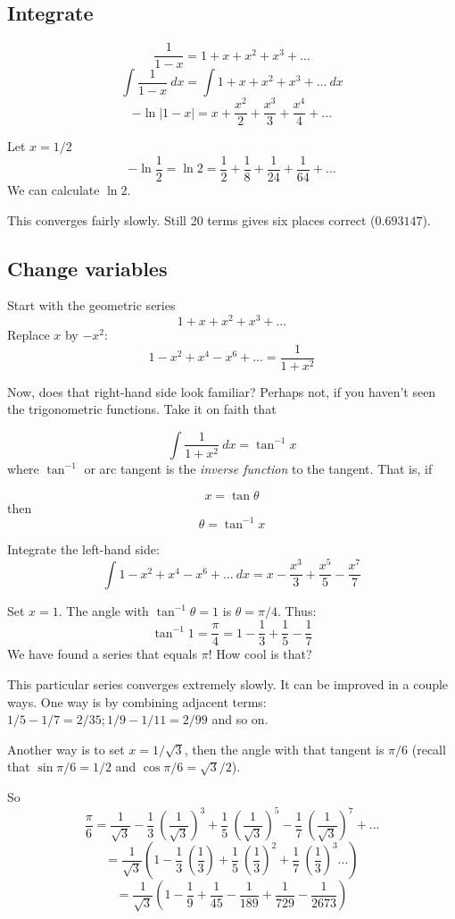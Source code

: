\documentclass[11pt, oneside]{article}
\begin{document}
\subsection*{Integrate}
\[    \frac{1}{1-x} = 1 + x + x^2 + x^3 + \dots \]
\[    \int \frac{1}{1-x} \ dx = \int 1 + x + x^2 + x^3 + \dots \ dx \]
\[     -\ln |1-x| = x + \frac{x^2}{2} + \frac{x^3}{3} + \frac{x^4}{4} + \dots \]

Let $x = 1/2$
\[ - \ln \frac{1}{2} = \ln 2 = \frac{1}{2} + \frac{1}{8} + \frac{1}{24} + \frac{1}{64} + \dots \]
We can calculate $\ln 2$.

This converges fairly slowly.  Still 20 terms gives six places correct ($0.693147$).

\subsection*{Change variables}
Start with the geometric series
\[    1 + x + x^2 + x^3 + \dots \]
Replace $x$ by $-x^2$:
\[    1 - x^2 + x^4 - x^6 + \dots = \frac{1}{1+x^2} \]

Now, does that right-hand side look familiar?  Perhaps not, if you haven't seen the trigonometric functions.  Take it on faith that

\[    \int \frac{1}{1+x^2} \ dx = \tan^{-1} x \]
where $ \tan^{-1}$ or arc tangent is the \emph{inverse function} to the tangent.  That is, if

\[ x = \tan \theta \]
then
\[ \theta = \tan^{-1} x \]

Integrate the left-hand side:
\[    \int 1 - x^2 + x^4 - x^6 + \dots \ dx = x - \frac{x^3}{3} + \frac{x^5}{5} - \frac{x^7}{7} \]

Set $x = 1$.  The angle with $\tan^{-1} \theta = 1$ is $\theta = \pi/4$.  Thus:
\[    \tan^{-1} 1 = \frac{\pi}{4} = 1 - \frac{1}{3} + \frac{1}{5} - \frac{1}{7} \]
We have found a series that equals $\pi$!  How cool is that?

This particular series converges extremely slowly.  It can be improved in a couple ways.  One way is by combining adjacent terms:  $1/5 - 1/7 = 2/35;  1/9 - 1/11 = 2/99$ and so on.

Another way is to set $x = 1/\sqrt{3}$, then the angle with that tangent is $\pi/6$ (recall that $\sin \pi/6 = 1/2$ and $\cos \pi/6 = \sqrt{3}/2$).

So
\[    \frac{\pi}{6} = \frac{1}{\sqrt{3}} - \frac{1}{3} \ (\frac{1}{\sqrt{3}})^3 +  \frac{1}{5} \ (\frac{1}{\sqrt{3}})^5 -  \frac{1}{7} \ (\frac{1}{\sqrt{3}})^7 + \dots \]
\[     = \frac{1}{\sqrt{3}} (1 - \frac{1}{3} \ (\frac{1}{3}) + \frac{1}{5} \ (\frac{1}{3})^2 + \frac{1}{7} \ (\frac{1}{3})^3 \dots) \]
\[    = \frac{1}{\sqrt{3}} (1 - \frac{1}{9} + \frac{1}{45} - \frac{1}{189} + \frac{1}{729} - \frac{1}{2673}) \]
\end{document}
